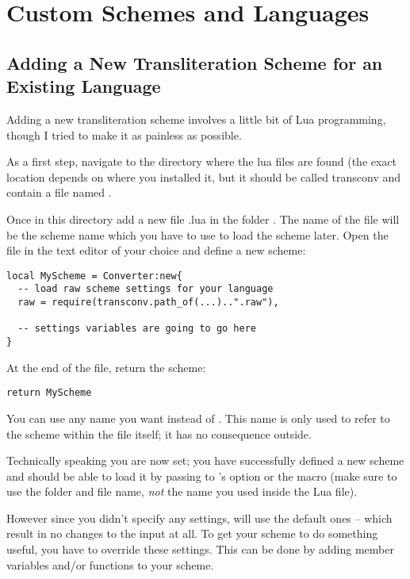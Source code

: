 \documentclass{ltxdockit}
\begin{document}
\section{Custom Schemes and Languages}

\subsection{Adding a New Transliteration Scheme for an Existing Language}

Adding a new transliteration scheme involves a little bit of Lua programming,
though I tried to make it as painless as possible.

As a first step, navigate to the directory where the \transconv{} lua files are
found (the exact location depends on where you installed it, but it should be
called transconv and contain a file named .

Once in this directory add a new file .lua in the folder .
The name of the file will be the scheme name which you have to use to load the
scheme later. Open the file in the text editor of your choice and define a new
scheme:

\begin{lstlisting}
local MyScheme = Converter:new{
  -- load raw scheme settings for your language
  raw = require(transconv.path_of(...)..".raw"),

  -- settings variables are going to go here
}
\end{lstlisting}

At the end of the file, return the scheme:

\begin{lstlisting}
return MyScheme
\end{lstlisting}

You can use any name you want instead of . This name is only used
to refer to the scheme within the file itself; it has no consequence outside.

Technically speaking you are now set; you have successfully defined a new scheme
and should be able to load it by passing  to
\transconv{}'s  option or the
 macro (make sure to use the
folder and file name, \emph{not} the name you used inside the Lua file).

However since you didn't specify any settings, \transconv{} will use the
default ones -- which result in no changes to the input at all. To get your
scheme to do something useful, you have to override these settings. This can be
done by adding member variables and/or functions to your scheme.
\end{document}
